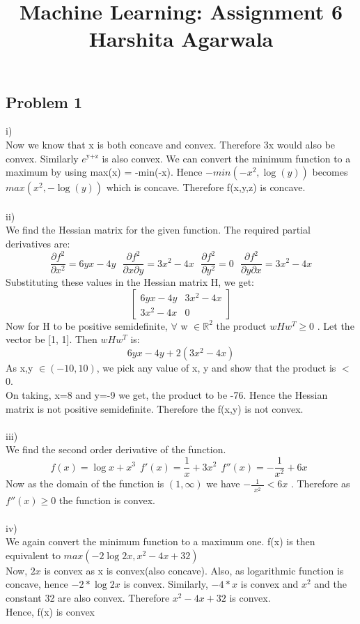 \documentclass[10pt, a4paper, fleqn]{article}
\begin{document}
\title{Machine Learning: Assignment 6\\
Harshita Agarwala}
\maketitle
\begin{singlespacing}
\section{Problem 1}
i)\\
Now we know that x is both concave and convex. Therefore 3x would also be convex. Similarly $e^\text{y+z}$ is also convex. We can convert the minimum function to a maximum by using max(x) = -min(-x). Hence $-min(-x^2, \log(y))$ becomes $max(x^2, -\log(y))$ which is concave. Therefore f(x,y,z) is concave.\\ \\
ii)\\
We find the Hessian matrix for the given function. The required partial derivatives are:
\begin{equation}
\frac{{\partial f^2}}{{\partial x^2}} = 6yx - 4y \ \ \
\frac{{\partial f^2}}{{\partial x \partial y}} = 3 x^2 - 4 x\ \ \ 
\frac{{\partial f^2}}{{\partial y^2}} = 0 \ \ \ 
\frac{{\partial f^2}}{{\partial y \partial x}} = 3 x^2 - 4 x
\end{equation}
Substituting these values in the Hessian matrix H, we get:
\[\begin{bmatrix}
6yx - 4y&3 x^2 - 4 x\\
3 x^2 - 4 x&0
\end{bmatrix}\]
Now for H to be positive semidefinite, $\forall$ w $\in \mathbb{R}^2$ the product $wHw^T \geq 0$ . Let the vector be [1, 1]. Then $wHw^T$ is:
\begin{equation*}
6yx - 4y + 2(3 x^2 - 4 x)
\end{equation*}
As x,y $\in (-10,10)$, we pick any value of x, y and show that the product is $<$ 0. \\
On taking, x=8 and y=-9 we get, the product to be -76. Hence the Hessian matrix is not positive semidefinite. Therefore the f(x,y) is not convex.\\ \\
iii)\\
We find the second order derivative of the function.
\begin{equation*}
f(x) = \log{x} + x^3 \ \ 
f'(x) = \frac{1}{x} + 3 x^2 \ \ 
f''(x) = - \frac{1}{x^2} + 6 x \ \  
\end{equation*}
Now as the domain of the function is $(1,\infty)$ we have $- \frac{1}{\substack{x^2}} < 6x$ . Therefore as $f''(x) \geq 0$ the function is convex.\\ \\
iv)\\
We again convert the minimum function to a maximum one. f(x) is then equivalent to $max(-2\log{2x}, x^2 - 4x + 32)$ \\ 
Now, $2x$ is convex as x is convex(also concave). Also, as logarithmic function is concave, hence $-2 * \log{2x}$ is convex.
Similarly, $-4 * x$ is convex and $x^2$ and the constant 32 are also convex. Therefore $x^2 - 4x + 32$ is convex.
\\Hence, f(x) is convex

\end{singlespacing}
\end{document}
